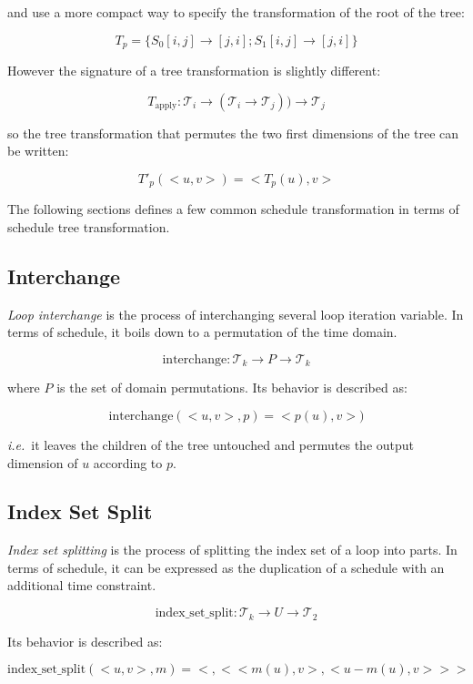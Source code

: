 \documentclass{article}
\begin{document}
\noindent and use a more compact way to specify the transformation of the root of the tree:

\[
    T_p = \{ S_0[i,j] \rightarrow [j,i] ; S_1[i,j] \rightarrow [j,i] \}
\]

However the signature of a tree transformation is slightly different:

\[
    T_\text{apply}: \mathcal{T}_i \rightarrow ( \mathcal{T}_i \rightarrow \mathcal{T}_j) ) \rightarrow \mathcal{T}_j
\]


\noindent so the tree transformation that permutes the two first dimensions of the tree can be written:

\[
    T'_p(< u, v >) = < T_p(u), v >
\]


The following sections defines a few common schedule transformation in terms of schedule tree transformation.

\subsection{Interchange}

\emph{Loop interchange} is the process of interchanging several loop iteration
variable. In terms of schedule, it boils down to a permutation of the time
domain.

\[
    \text{interchange}: \mathcal{T}_k \rightarrow P \rightarrow \mathcal{T}_k
\]

\noindent where $P$ is the set of domain permutations. Its behavior is described as:

\[
    \text{interchange}(<u, v>, p) = <p(u), v>)
\]

\noindent \emph{i.e.}\ it leaves the children of the tree untouched and
permutes the output dimension of $u$ according to $p$.

\subsection{Index Set Split}

\emph{Index set splitting} is the process of splitting the index set of a loop
into parts. In terms of schedule, it can be expressed as the duplication of a
schedule with an additional time constraint.

\[
    \text{index\_set\_split}: \mathcal{T}_k \rightarrow U \rightarrow \mathcal{T}_2
\]

Its behavior is described as:

\[
    \text{index\_set\_split}(<u, v>, m) = < {}, < < m(u), v>, < u - m(u), v> > >
\]
\end{document}
